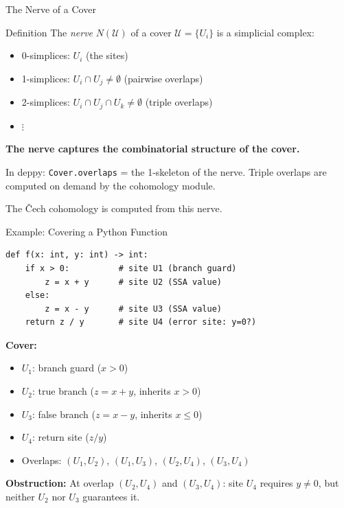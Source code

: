 \documentclass[aspectratio=169,10pt]{beamer}
\newcommand{\Uscr}{\mathcal{U}}
\begin{document}
\begin{frame}{The Nerve of a Cover}
\begin{block}{Definition}
The \emph{nerve} $N(\Uscr)$ of a cover $\Uscr = \{U_i\}$ is a simplicial complex:
\begin{itemize}
  \item 0-simplices: $U_i$ (the sites)
  \item 1-simplices: $U_i \cap U_j \neq \emptyset$ (pairwise overlaps)
  \item 2-simplices: $U_i \cap U_j \cap U_k \neq \emptyset$ (triple overlaps)
  \item $\vdots$
\end{itemize}
\end{block}

\textbf{The nerve captures the combinatorial structure of the cover.}

In deppy: \texttt{Cover.overlaps} = the 1-skeleton of the nerve. Triple overlaps are computed on demand by the cohomology module.

\vspace{0.3em}
The \v{C}ech cohomology is computed from this nerve.
\end{frame}

\begin{frame}[fragile]{Example: Covering a Python Function}
\begin{lstlisting}
def f(x: int, y: int) -> int:
    if x > 0:          # site U1 (branch guard)
        z = x + y      # site U2 (SSA value)
    else:
        z = x - y      # site U3 (SSA value)
    return z / y       # site U4 (error site: y=0?)
\end{lstlisting}

\textbf{Cover:}
\begin{itemize}
  \item $U_1$: branch guard ($x > 0$)
  \item $U_2$: true branch ($z = x + y$, inherits $x > 0$)
  \item $U_3$: false branch ($z = x - y$, inherits $x \leq 0$)
  \item $U_4$: return site ($z / y$)
  \item Overlaps: $(U_1, U_2)$, $(U_1, U_3)$, $(U_2, U_4)$, $(U_3, U_4)$
\end{itemize}

\textbf{Obstruction:} At overlap $(U_2, U_4)$ and $(U_3, U_4)$: site $U_4$ requires $y \neq 0$, but neither $U_2$ nor $U_3$ guarantees it.
\end{frame}
\end{document}
